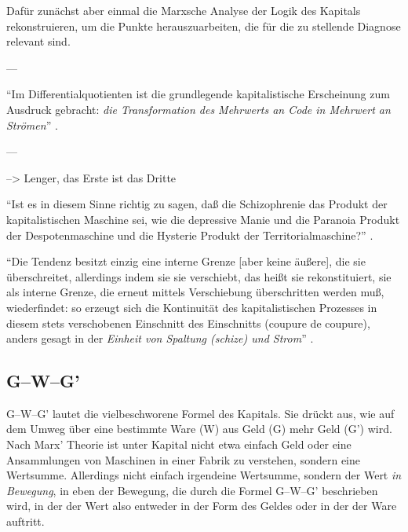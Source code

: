 \documentclass[12pt,
               DIV13,
               paper=a4,
               twoside=false,
               onehalfspacing,
               bibliography=totoc,
               toc=graduated,
               draft,
               ]{scrartcl}
\newcommand{\pc}[2]{\parencite[#1]{#2}}
\newcommand{\worries}[1]{\ifdraft{\textcolor{blue}{\texttt{(#1)}}}{}}
\newcommand{\gwg}{G--W--G'\xspace}
\begin{document}
Dafür zunächst aber einmal die Marxsche Analyse der Logik des Kapitals
rekonstruieren, um die Punkte herauszuarbeiten, die für die zu
stellende Diagnose relevant sind.

---

"`Im Differentialquotienten ist die grundlegende kapitalistische
Erscheinung zum Ausdruck gebracht: \emph{die Transformation des
Mehrwerts an Code in Mehrwert an Strömen}"' \pc{S. 292 f.}{ao}.

---

--> Lenger, das Erste ist das Dritte

"`Ist es in diesem Sinne richtig zu sagen, daß die Schizophrenie das
Produkt der kapitalistischen Maschine sei, wie die depressive Manie
und die Paranoia Produkt der Despotenmaschine und die Hysterie Produkt
der Territorialmaschine?"' \pc{44}{ao}.

"`Die Tendenz besitzt einzig eine interne Grenze [aber keine äußere],
die sie überschreitet, allerdings indem sie sie verschiebt, das heißt
sie rekonstituiert, sie als interne Grenze, die erneut mittels
Verschiebung überschritten \worries{Selbst-Überschreitung} werden muß,
wiederfindet: so erzeugt sich die Kontinuität des kapitalistischen
Prozesses in diesem stets verschobenen Einschnitt des Einschnitts
(coupure de coupure), anders gesagt in der \emph{Einheit von Spaltung
(schize) und Strom}"' \pc{S. 296, meine Hervorh.}{ao}.



\subsection{\gwg}
\label{gwg}

\gwg lautet die vielbeschworene Formel des Kapitals. Sie drückt aus,
wie auf dem Umweg über eine bestimmte Ware (W) aus Geld (G) mehr Geld
(G') wird. Nach Marx' Theorie ist unter Kapital nicht etwa einfach
Geld oder eine Ansammlungen von Maschinen in einer Fabrik zu
verstehen, sondern eine Wertsumme. Allerdings nicht einfach irgendeine
Wertsumme, sondern der Wert \emph{in Bewegung}, in eben der Bewegung,
die durch die Formel \gwg beschrieben wird, in der der Wert also
entweder in der Form des Geldes oder in der der Ware auftritt.


\end{document}
